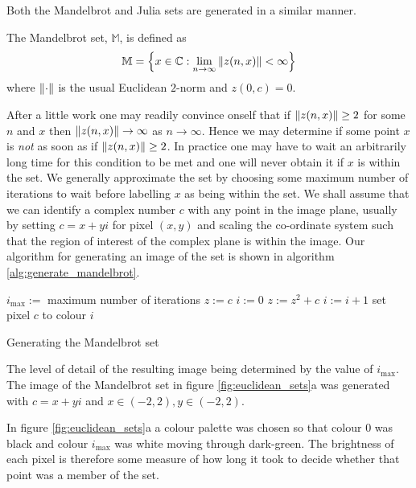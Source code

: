 Both the Mandelbrot and Julia sets are generated in a similar manner.

\begin{definition}
The Mandelbrot set, $\mathbb{M}$, is defined as
\[
\mathbb{M} = 
\left\{x \in \mathbb{C} 
: \lim_{n \rightarrow \infty} \left\Vert z(n,x) \right\Vert < \infty \right\} 
\]
where $\left\Vert \cdot \right\Vert$ is the usual Euclidean $2$-norm and $z(0,c) = 0$.
\end{definition}

After a little work one may readily convince onself that if $\left\Vert z(n,x) \right\Vert \ge 2$
for some $n$ and $x$ then $\left\Vert z(n,x) \right\Vert \rightarrow \infty$ as $n \rightarrow \infty$.
Hence we may determine if some point $x$ is \emph{not} as soon as if $\left\Vert z(n,x) \right\Vert \ge 2$. 
In practice one may have to wait an arbitrarily long time for this condition to be met
and one will never obtain it if $x$ is within the set. We generally approximate the
set by choosing some maximum number of iterations to wait before labelling
$x$ as being within the set. We shall assume that we can identify a complex number $c$ 
with any point in the image plane, usually by setting $c = x + yi$ for pixel
$(x,y)$ and scaling the co-ordinate system such that the region of interest of
the complex plane is within the image.  Our algorithm for generating an image of the
set is shown in algorithm \ref{alg:generate_mandelbrot}.

\begin{fancyalg}
\begin{algorithmic}[1]
\STATE $i_{\mbox{max}} :=$ maximum number of iterations
\STATE $z := c$
\STATE $i := 0$
  \STATE $z := z^2 + c$
  \STATE $i := i+1$
\ENDWHILE 
\STATE set pixel $c$ to colour $i$
\ENDFOR
\end{algorithmic}
\caption{
\label{alg:generate_mandelbrot}
  Generating the Mandelbrot set}
\end{fancyalg}

The level of detail of the resulting image being determined by the value of $i_{\mbox{max}}$.
The image of the Mandelbrot set in figure \ref{fig:euclidean_sets}a was
generated with $c = x + yi$ and $x \in (-2,2), y \in (-2,2)$.

In figure \ref{fig:euclidean_sets}a a colour palette was chosen so that colour 0 was black
and colour $i_{\mbox{max}}$ was white moving through dark-green. The brightness of
each pixel is therefore some measure of how long it took to decide whether that point was
a member of the set.

